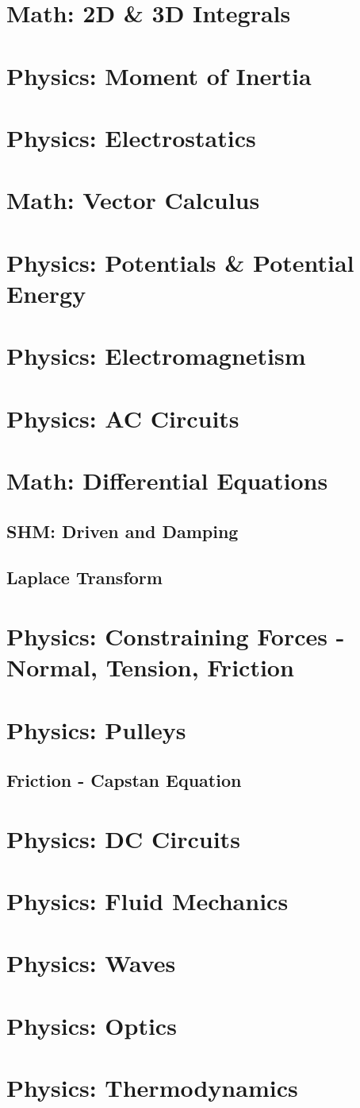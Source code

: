 \documentclass{article}
\begin{document}
\section{Math: 2D \& 3D Integrals}
\section{Physics: Moment of Inertia}
\section{Physics: Electrostatics}

\section{Math: Vector Calculus}
\section{Physics: Potentials \& Potential Energy}
\section{Physics: Electromagnetism}
\section{Physics: AC Circuits}

\section{Math: Differential Equations}
\subsection{SHM: Driven and Damping}
\subsection{Laplace Transform}

\section{Physics: Constraining Forces - Normal, Tension, Friction}
\section{Physics: Pulleys}
\subsection{Friction - Capstan Equation}
\section{Physics: DC Circuits}
\section{Physics: Fluid Mechanics}
\section{Physics: Waves}
\section{Physics: Optics}
\section{Physics: Thermodynamics}
\end{document}
